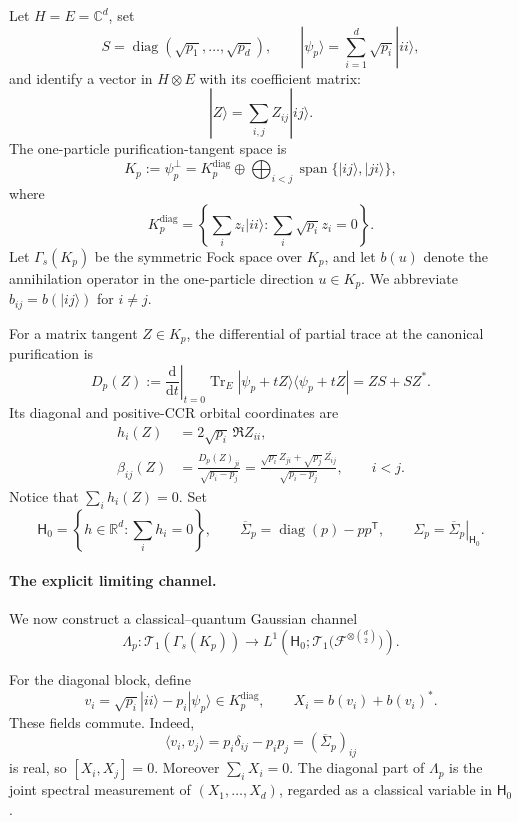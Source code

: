 \documentclass[11pt]{article}
\theoremstyle{remark}
\theoremstyle{plain}
\newcommand{\C}{\mathbb C}
\newcommand{\R}{\mathbb R}
\newcommand{\cF}{\mathcal F}
\newcommand{\cT}{\mathcal T}
\newcommand{\dd}{\mathrm d}
\newcommand{\diag}{\operatorname{diag}}
\newcommand{\Tr}{\operatorname{Tr}}
\newcommand{\ket}[1]{|#1\rangle}
\newcommand{\proj}[1]{|#1\rangle\!\langle #1|}
\newcommand{\ot}{\otimes}
\begin{document}
Let \(H=E=\C^d\), set
\[
  S=\diag(\sqrt{p_1},\ldots,\sqrt{p_d}),
  \qquad
  \ket{\psi_p}=\sum_{i=1}^d\sqrt{p_i}\ket{ii},
\]
and identify a vector in \(H\ot E\) with its coefficient matrix:
\[
  \ket Z=\sum_{i,j}Z_{ij}\ket{ij}.
\]
The one-particle purification-tangent space is
\[
  K_p:=\psi_p^\perp
  =K_p^{\mathrm{diag}}
   \oplus\bigoplus_{i<j}\operatorname{span}\{\ket{ij},\ket{ji}\},
\]
where
\[
  K_p^{\mathrm{diag}}
  =\left\{
    \sum_i z_i\ket{ii}:\sum_i\sqrt{p_i}z_i=0
   \right\}.
\]
Let \(\Gamma_s(K_p)\) be the symmetric Fock space over \(K_p\), and let
\(b(u)\) denote the annihilation operator in the one-particle direction
\(u\in K_p\).  We abbreviate
\(b_{ij}=b(\ket{ij})\) for \(i\ne j\).

For a matrix tangent \(Z\in K_p\), the differential of partial trace at the
canonical purification is
\begin{equation}\label{eq:partial-trace-differential}
  D_p(Z)
  :=\left.\frac{\dd}{\dd t}\right|_{t=0}
     \Tr_E\proj{\psi_p+tZ}
  =ZS+SZ^*.
\end{equation}
Its diagonal and positive-CCR orbital coordinates are
\begin{align}
  h_i(Z)&=2\sqrt{p_i}\,\Re Z_{ii},
  \label{eq:h-Z}\\
  \beta_{ij}(Z)
  &=\frac{D_p(Z)_{ji}}{\sqrt{p_i-p_j}}
    =\frac{\sqrt{p_i}Z_{ji}
            +\sqrt{p_j}\,\overline{Z_{ij}}}
           {\sqrt{p_i-p_j}},
  \qquad i<j.
  \label{eq:beta-Z}
\end{align}
Notice that \(\sum_i h_i(Z)=0\).  Set
\[
  \mathsf H_0=\left\{h\in\R^d:\sum_i h_i=0\right\},
  \qquad
  \overline\Sigma_p=\diag(p)-pp^{\mathsf T},
  \qquad
  \Sigma_p=\left.\overline\Sigma_p\right|_{\mathsf H_0}.
\]

\paragraph{The explicit limiting channel.}

We now construct a classical--quantum Gaussian channel
\[
  \Lambda_p:\cT_1(\Gamma_s(K_p))
  \longrightarrow
  L^1\!\left(
    \mathsf H_0;
    \cT_1\bigl(\cF^{\ot\binom d2}\bigr)
  \right).
\]

For the diagonal block, define
\begin{equation}\label{eq:v-i}
  v_i=\sqrt{p_i}\ket{ii}-p_i\ket{\psi_p}
  \in K_p^{\mathrm{diag}},
  \qquad
  X_i=b(v_i)+b(v_i)^*.
\end{equation}
These fields commute.  Indeed,
\begin{equation}\label{eq:v-gram}
  \langle v_i,v_j\rangle
  =p_i\delta_{ij}-p_ip_j=(\overline\Sigma_p)_{ij}
\end{equation}
is real, so \([X_i,X_j]=0\).  Moreover \(\sum_iX_i=0\).  The
diagonal part of \(\Lambda_p\) is the joint spectral measurement of
\((X_1,\ldots,X_d)\), regarded as a classical variable in
\(\mathsf H_0\).
\end{document}
